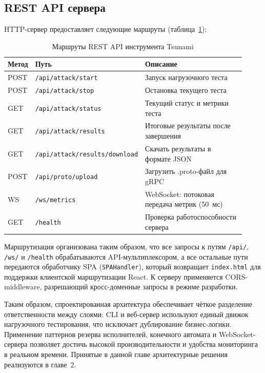 \subsection*{REST API сервера}

HTTP-сервер предоставляет следующие маршруты (таблица~\ref{tab:ch1-api}):

\begin{table}[h!]
  \centering
  \caption{Маршруты REST API инструмента Tsunami}
  \label{tab:ch1-api}
  \small
  \begin{tabular}{|p{0.10\linewidth}|p{0.34\linewidth}|p{0.48\linewidth}|}
    \hline
    \textbf{Метод} & \textbf{Путь} & \textbf{Описание} \\
    \hline
    POST & \texttt{/api/attack/start}            & Запуск нагрузочного теста \\
    \hline
    POST & \texttt{/api/attack/stop}             & Остановка текущего теста \\
    \hline
    GET  & \texttt{/api/attack/status}           & Текущий статус и метрики теста \\
    \hline
    GET  & \texttt{/api/attack/results}          & Итоговые результаты после завершения \\
    \hline
    GET  & \texttt{/api/attack/results/download} & Скачать результаты в формате JSON \\
    \hline
    POST & \texttt{/api/proto/upload}            & Загрузить .proto-файл для gRPC \\
    \hline
    WS   & \texttt{/ws/metrics}                  & WebSocket: потоковая передача метрик (50~мс) \\
    \hline
    GET  & \texttt{/health}                      & Проверка работоспособности сервера \\
    \hline
  \end{tabular}
\end{table}

Маршрутизация организована таким образом, что все запросы к путям \texttt{/api/},
\texttt{/ws/} и \texttt{/health} обрабатываются API-мультиплексором,
а все остальные пути передаются обработчику SPA (\texttt{SPAHandler}),
который возвращает \texttt{index.html} для поддержки клиентской маршрутизации React.
К серверу применяется CORS-middleware, разрешающий кросс-доменные запросы
в режиме разработки.

Таким образом, спроектированная архитектура обеспечивает чёткое разделение
ответственности между слоями: CLI и веб-сервер используют единый движок
нагрузочного тестирования, что исключает дублирование бизнес-логики.
Применение паттернов резерва исполнителей, конечного автомата и WebSocket-сервера
позволяет достичь высокой производительности и удобства мониторинга в реальном времени.
Принятые в данной главе архитектурные решения реализуются в главе~2.
